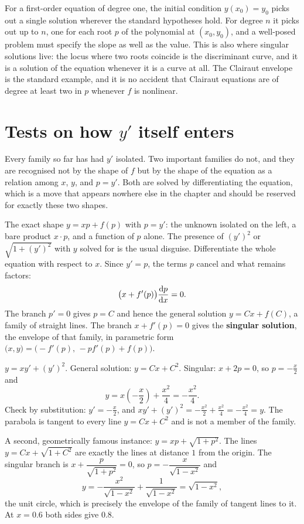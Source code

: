 \begin{keynote}
For a first-order equation of degree one, the initial condition $y(x_0)=y_0$ picks out a single solution wherever the standard hypotheses hold. For degree $n$ it picks out up to $n$, one for each root $p$ of the polynomial at $(x_0,y_0)$, and a well-posed problem must specify the slope as well as the value. This is also where singular solutions live: the locus where two roots coincide is the discriminant curve, and it is a solution of the equation whenever it is a curve at all. The Clairaut envelope is the standard example, and it is no accident that Clairaut equations are of degree at least two in $p$ whenever $f$ is nonlinear.
\end{keynote}

\section{Tests on how $y'$ itself enters}

Every family so far has had $y'$ isolated. Two important families do not, and they are recognised not by the shape of $f$ but by the shape of the equation as a relation among $x$, $y$, and $p=y'$. Both are solved by differentiating the equation, which is a move that appears nowhere else in the chapter and should be reserved for exactly these two shapes.

\cue The exact shape $y=xp+f(p)$ with $p=y'$: the unknown isolated on the left, a bare product $x\cdot p$, and a function of $p$ alone. The presence of $(y')^{2}$ or $\sqrt{1+(y')^{2}}$ with $y$ solved for is the usual disguise.
\method Differentiate the whole equation with respect to $x$. Since $y'=p$, the terms $p$ cancel and what remains factors:
\[\bigl(x+f'(p)\bigr)\frac{\mathrm{d}p}{\mathrm{d}x}=0.\]
The branch $p'=0$ gives $p=C$ and hence the general solution $y=Cx+f(C)$, a family of straight lines. The branch $x+f'(p)=0$ gives the \textbf{singular solution}, the envelope of that family, in parametric form $\bigl(x,y\bigr)=\bigl(-f'(p),\,-pf'(p)+f(p)\bigr)$.

\begin{worked}
$y=xy'+(y')^{2}$. General solution: $y=Cx+C^{2}$. Singular: $x+2p=0$, so $p=-\tfrac x2$ and
\[y=x\left(-\frac x2\right)+\frac{x^{2}}{4}=-\frac{x^{2}}{4}.\]
Check by substitution: $y'=-\tfrac x2$, and $xy'+(y')^{2}=-\tfrac{x^{2}}{2}+\tfrac{x^{2}}{4}=-\tfrac{x^{2}}{4}=y$. The parabola is tangent to every line $y=Cx+C^{2}$ and is not a member of the family.

A second, geometrically famous instance: $y=xp+\sqrt{1+p^{2}}$. The lines $y=Cx+\sqrt{1+C^{2}}$ are exactly the lines at distance $1$ from the origin. The singular branch is $x+\dfrac{p}{\sqrt{1+p^{2}}}=0$, so $p=-\dfrac{x}{\sqrt{1-x^{2}}}$ and
\[y=-\frac{x^{2}}{\sqrt{1-x^{2}}}+\frac{1}{\sqrt{1-x^{2}}}=\sqrt{1-x^{2}},\]
the unit circle, which is precisely the envelope of the family of tangent lines to it. At $x=0.6$ both sides give $0.8$.
\end{worked}

